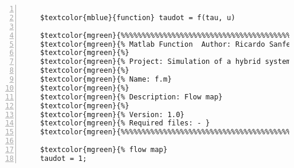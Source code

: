 %  
%  
%  
%  
  
  
\DefineShortVerb[fontfamily=courier,fontseries=m]{\$} 
\DefineShortVerb[fontfamily=courier,fontseries=b]{\#} 
  
\begin{Verbatim}[commandchars=\$\{\},numbers=left,numbersep=2pt] 

    $textcolor{mblue}{function} taudot = f(tau, u) 
     
    $textcolor{mgreen}{%%%%%%%%%%%%%%%%%%%%%%%%%%%%%%%%%%%%%%%%%%%%%%%%%%%%%%%%%%%%%%%%%%%%%%%%%%%} 
    $textcolor{mgreen}{% Matlab Function  Author: Ricardo Sanfelice} 
    $textcolor{mgreen}{%} 
    $textcolor{mgreen}{% Project: Simulation of a hybrid system (interconnection)} 
    $textcolor{mgreen}{%} 
    $textcolor{mgreen}{% Name: f.m} 
    $textcolor{mgreen}{%} 
    $textcolor{mgreen}{% Description: Flow map} 
    $textcolor{mgreen}{%} 
    $textcolor{mgreen}{% Version: 1.0} 
    $textcolor{mgreen}{% Required files: - } 
    $textcolor{mgreen}{%%%%%%%%%%%%%%%%%%%%%%%%%%%%%%%%%%%%%%%%%%%%%%%%%%%%%%%%%%%%%%%%%%%%%%%%%%%} 
     
    $textcolor{mgreen}{% flow map} 
    taudot = 1;  
\end{Verbatim}  
  
\UndefineShortVerb{\$} 
\UndefineShortVerb{\#} 
 